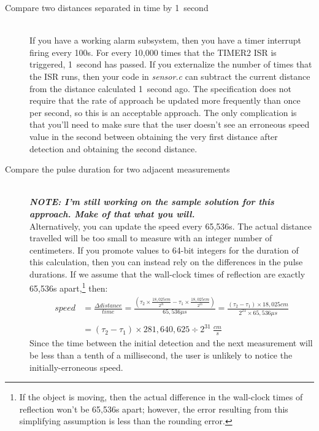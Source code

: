 \begin{description}
    \item[Compare two distances separated in time by 1~second] \phantom{ } \\
        If you have a working alarm subsystem, then you have a timer interrupt firing every 100\textmu s.
        For every 10,000 times that the TIMER2 ISR is triggered, 1~second has passed.
        If you externalize the number of times that the ISR runs, then your code in \textit{sensor.c} can subtract the current distance from the distance calculated 1~second ago.
        The specification does not require that the rate of approach be updated more frequently than once per second, so this is an acceptable approach.
        The only complication is that you'll need to make sure that the user doesn't see an erroneous speed value in the second between obtaining the very first distance after detection and obtaining the second distance.

    \item[Compare the pulse duration for two adjacent measurements] \phantom{ } \\ \textbf{\textit{\tiny NOTE: I'm still working on the sample solution for this approach. Make of that what you will.}} \\
        Alternatively, you can update the speed every 65,536\textmu s.
        The actual distance travelled will be too small to measure with an integer number of centimeters.
        If you promote values to 64-bit integers for the duration of this calculation, then you can instead rely on the differences in the pulse durations.
        If we assume that the wall-clock times of reflection are exactly 65,536\textmu s apart,\footnote{
            If the object is moving, then the actual difference in the wall-clock times of reflection won't be 65,536\textmu s apart; however, the error resulting from this simplifying assumption is less than the rounding error.
        } then:
        \begin{align*}
            speed & = \frac{\Delta distance}{time} = \frac{\left( \tau_2 \times \frac{18,025 cm}{2^{21}} - \tau_1 \times \frac{18,025 cm}{2^{21}} \right)}{65,536\mu s} = \frac{\left( \tau_2 - \tau_1 \right) \times 18,025 cm}{2^{21} \times 65,536\mu s} \\
                  & \\
                  & =  \left( \tau_2 - \tau_1 \right) \times 281,640,625 \div 2^{31} \ \frac{cm}{s}
        \end{align*}
        Since the time between the initial detection and the next measurement will be less than a tenth of a millisecond, the user is unlikely to notice the initially-erroneous speed.
\end{description}

